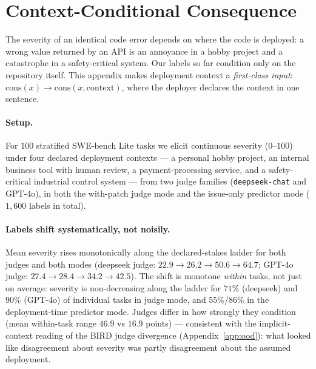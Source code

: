 \documentclass{article}
\begin{document}
\section{Context-Conditional Consequence}
\label{app:context}

The severity of an identical code error depends on where the code is
deployed: a wrong value returned by an API is an annoyance in a
hobby project and a catastrophe in a safety-critical system. Our
labels so far condition only on the repository itself. This appendix
makes deployment context a \emph{first-class input}:
$\mathrm{cons}(x) \to \mathrm{cons}(x, \mathrm{context})$, where the
deployer declares the context in one sentence.

\paragraph{Setup.} For $100$ stratified SWE-bench Lite tasks we
elicit continuous severity ($0$--$100$) under four declared
deployment contexts --- a personal hobby project, an internal
business tool with human review, a payment-processing service, and a
safety-critical industrial control system --- from two judge
families (\texttt{deepseek-chat} and GPT-4o), in both the
with-patch judge mode and the issue-only predictor mode
($1{,}600$ labels in total).

\paragraph{Labels shift systematically, not noisily.} Mean severity
rises monotonically along the declared-stakes ladder for both judges
and both modes (deepseek judge: $22.9 \to 26.2 \to 50.6 \to 64.7$;
GPT-4o judge: $27.4 \to 28.4 \to 34.2 \to 42.5$). The shift is
monotone \emph{within} tasks, not just on average: severity is
non-decreasing along the ladder for $71\%$ (deepseek) and $90\%$
(GPT-4o) of individual tasks in judge mode, and $55\%$/$86\%$ in
the deployment-time predictor mode. Judges differ in how strongly
they condition (mean within-task range $46.9$ vs $16.9$ points) ---
consistent with the implicit-context reading of the BIRD judge
divergence (Appendix~\ref{app:ood}): what looked like disagreement
about severity was partly disagreement about the assumed deployment.
\end{document}
